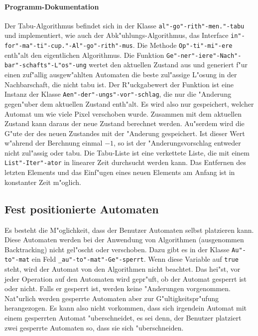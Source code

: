 \paragraph{Programm-Dokumentation}
Der Tabu-Algorithmus befindet sich in der Klasse \texttt{al"-go"-rith"-men."-tabu} und implementiert, wie auch der Abk"uhlungs-Algorithmus, das Interface \texttt{in"-for"-ma"-ti"-cup."-Al"-go"-rith"-mus}. Die Methode \texttt{Op"-ti"-mi"-ere} enth"alt den eigentlichen Algorithmus. Die Funktion \texttt{Ge"-ner"-iere"-Nach"-bar"-schafts"-L"os"-ung} wertet den aktuellen Zustand aus und generiert f"ur einen zuf"allig ausgew"ahlten Automaten die beste zul"assige L"osung in der Nachbarschaft, die nicht tabu ist. Der R"uckgabewert der Funktion ist eine Instanz der Klasse \texttt{Aen"-der"-ungs"-vor"-schlag}, die nur die "Anderung gegen"uber dem aktuellen Zustand enth"alt. Es wird also nur gespeichert, welcher Automat um wie viele Pixel verschoben wurde. Zusammen mit dem aktuellen Zustand kann daraus der neue Zustand berechnet werden. Au"serdem wird die G"ute der des neuen Zustandes mit der "Anderung gespeichert. Ist dieser Wert w"ahrend der Berchnung einmal \(-1\), so ist der "Anderungsvorschlag entweder nicht zul"assig oder tabu. Die Tabu-Liste ist eine verkettete Liste, die mit einem \texttt{List"-Iter"-ator} in linearer Zeit durchsucht werden kann. Das Entfernen des letzten Elements und das Einf"ugen eines neuen Elements am Anfang ist in konstanter Zeit m"oglich. 

\subsection{Fest positionierte Automaten}
Es besteht die M"oglichkeit, dass der Benutzer Automaten selbst platzieren kann. Diese Automaten werden bei der Anwendung von Algorithmen (ausgenommen Backtracking) nicht gel"oscht oder verschoben. Dazu gibt es in der Klasse \texttt{Au"-to"-mat} ein Feld \texttt{\_au"-to"-mat"-Ge"-sperrt}. Wenn diese Variable auf \texttt{true} steht, wird der Automat von den Algorithmen nicht beachtet. Das hei"st, vor jeder Operation auf den Automaten wird gepr"uft, ob der Automat gesperrt ist oder nicht. Falls er gesperrt ist, werden keine "Anderungen vorgenommen. Nat"urlich werden gesperrte Automaten aber zur G"ultigkeitspr"ufung herangezogen. Es kann also nicht vorkommen, dass sich irgendein Automat mit einem gesperrten Automat "uberschneidet, es sei denn, der Benutzer platziert zwei gesperrte Automaten so, dass sie sich "uberschneiden.